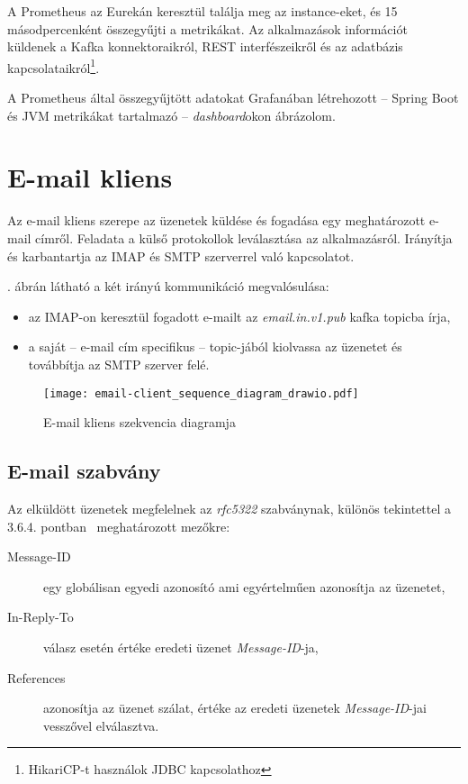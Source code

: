 A Prometheus az Eurekán keresztül találja meg az instance-eket, és 15 másodpercenként összegyűjti a metrikákat. Az alkalmazások információt küldenek a Kafka konnektoraikról, REST interfészeikről és az adatbázis kapcsolataikról\footnote{HikariCP-t használok JDBC kapcsolathoz}.

A Prometheus által összegyűjtött adatokat Grafanában létrehozott --  Spring Boot és JVM metrikákat tartalmazó --   \textit{dashboard}okon ábrázolom.


\section{E-mail kliens}
Az e-mail kliens szerepe az üzenetek küldése és fogadása egy meghatározott e-mail címről. Feladata a külső protokollok leválasztása az alkalmazásról. Irányítja és karbantartja az IMAP és SMTP szerverrel való kapcsolatot.

. ábrán látható a két irányú kommunikáció megvalósulása:
\begin{itemize}
	\item az IMAP-on keresztül fogadott e-mailt az \textit{email.in.v1.pub} kafka topicba írja,
	\item a saját --  e-mail cím specifikus --   topic-jából kiolvassa az üzenetet és továbbítja  az SMTP szerver felé.
\end{itemize}


\begin{figure}[hbt] 
	\centering
	\texttt{[image: email-client\_sequence\_diagram\_drawio.pdf]}
	\caption{E-mail kliens szekvencia diagramja}
	\label{fig:email-client_sequence_diagram}
\end{figure}




\subsection{E-mail szabvány}
Az elküldött üzenetek megfelelnek az \textit{rfc5322} szabványnak, különös tekintettel a 3.6.4. pontban~\cite{rfc5322_Identification_Fields} meghatározott mezőkre:

\begin{description}
	\item[Message-ID] egy globálisan egyedi azonosító ami egyértelműen azonosítja az üzenetet,
	
	\item[In-Reply-To] válasz esetén értéke eredeti üzenet \textit{Message-ID}-ja,
	
	\item[References] azonosítja az üzenet szálat, értéke az eredeti üzenetek \textit{Message-ID}-jai vesszővel elválasztva.
\end{description}


